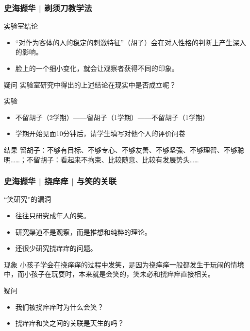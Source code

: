 \begin{frame}
  \frametitle{史海撷华 | 剃须刀教学法}
  \begin{block}{实验室结论}
    \begin{itemize}
      \item “对作为客体的人的稳定的刺激特征”（胡子）会在对人性格的判断上产生深入的影响。
      \item 脸上的一个细小变化，就会让观察者获得不同的印象。
    \end{itemize}
  \end{block}
  \vspace{-0.5em}
  \pause
  \begin{block}{疑问}
      实验室研究中得出的上述结论在现实中是否成立呢？
  \end{block}
  \vspace{-0.5em}
  \pause
  \begin{block}{实验}
    \begin{itemize}
      \item 不留胡子（2学期）——留胡子（1学期）——不留胡子（1学期）
      \item 学期开始见面10分钟后，请学生填写对他个人的评价问卷
    \end{itemize}
  \end{block}
  \vspace{-0.5em}
  \pause
  \begin{block}{结果}
留胡子：不够有目标、不够专心、不够友善、不够坚强、不够理智、不够聪明……；不留胡子：看起来不拘束、比较随意、比较有发展势头……
  \end{block}
\end{frame}

\begin{frame}
  \frametitle{史海撷华 | 挠痒痒 | 与笑的关联}
  \begin{block}{“笑研究”的漏洞}
    \begin{itemize}
      \item 往往只研究成年人的笑。
      \item 研究渠道不是观察，而是推想和纯粹的理论。
      \item 还很少研究挠痒痒的问题。
    \end{itemize}
  \end{block}
  \pause
  \begin{block}{现象}
小孩子学会在挠痒痒的过程中发笑，是因为挠痒痒一般都发生于玩闹的情境中，而小孩子在玩耍时，本来就是会笑的，笑未必和挠痒痒直接相关。
  \end{block}
  \pause
  \begin{block}{疑问}
    \begin{itemize}
      \item 我们被挠痒痒时为什么会笑？
      \item 挠痒痒和笑之间的关联是天生的吗？
    \end{itemize}
  \end{block}
\end{frame}

